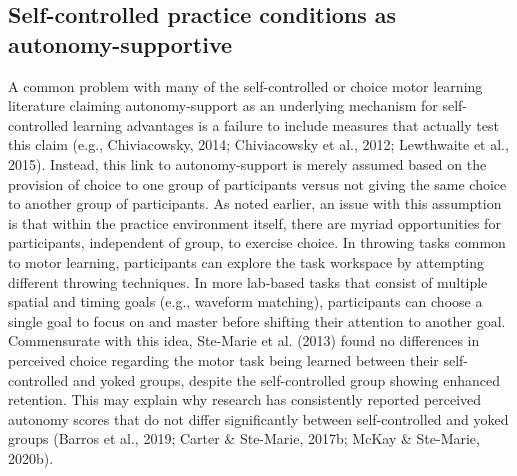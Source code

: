 \documentclass[
  english,
  man,floatsintext]{apa7}
\begin{document}
\hypertarget{self-controlled-practice-conditions-as-autonomy-supportive}{%
\subsection{Self-controlled practice conditions as autonomy-supportive}\label{self-controlled-practice-conditions-as-autonomy-supportive}}

A common problem with many of the self-controlled or choice motor learning literature claiming autonomy-support as an underlying mechanism for self-controlled learning advantages is a failure to include measures that actually test this claim (e.g., Chiviacowsky, 2014; Chiviacowsky et al., 2012; Lewthwaite et al., 2015). Instead, this link to autonomy-support is merely assumed based on the provision of choice to one group of participants versus not giving the same choice to another group of participants. As noted earlier, an issue with this assumption is that within the practice environment itself, there are myriad opportunities for participants, independent of group, to exercise choice. In throwing tasks common to motor learning, participants can explore the task workspace by attempting different throwing techniques. In more lab-based tasks that consist of multiple spatial and timing goals (e.g., waveform matching), participants can choose a single goal to focus on and master before shifting their attention to another goal. Commensurate with this idea, Ste-Marie et al. (2013) found no differences in perceived choice regarding the motor task being learned between their self-controlled and yoked groups, despite the self-controlled group showing enhanced retention. This may explain why research has consistently reported perceived autonomy scores that do not differ significantly between self-controlled and yoked groups (Barros et al., 2019; Carter \& Ste-Marie, 2017b; McKay \& Ste-Marie, 2020b).
\end{document}
